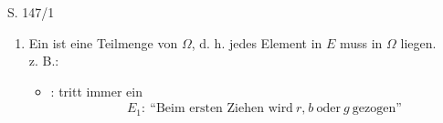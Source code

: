 \begin{Exercise}{S. 147/1}{}
\begin{enumerate}[leftmargin=*]
{\begin{enumerate}[label=\alph*),leftmargin=*]
{\begin{minipage}[t]{0.35\linewidth}
{\begin{tikzpicture}
            \end{tikzpicture}
            }
            \end{minipage}
            \hfill
            \begin{minipage}[t]{0.55\linewidth}
                \vspace{-2.0ex}
                \begin{align*}
                    \Omega &= {\begin{array}[t]{l}
                                \{ (r; b); \ (r; g); \ (r; r)\\
                                (g; b); \ (g; g); \ (g; r)\\
                                (b; g); \ (b; r) \}
                                \end{array}}
                                \\
                    \abs{\Omega} &= 9
                \end{align*}
            \end{minipage}
            }
        \item[b)] {
            Ein  ist eine Teilmenge von $\Omega$, d. h. jedes Element in $E$ muss in $\Omega$ liegen.\\[1.0ex]
            z. B.: \\[1.0ex]
            \begin{itemize}[leftmargin=*]
                \item {
                    : tritt immer ein
                    \begin{align*}
                        &E_{1}: \ \text{``Beim ersten Ziehen wird} \ r \text{,} \ b \ \text{oder} \ g \ \text{gezogen''}\\

\end{align*}}
\end{itemize}}
\end{enumerate}}
\end{enumerate}
\end{Exercise}
